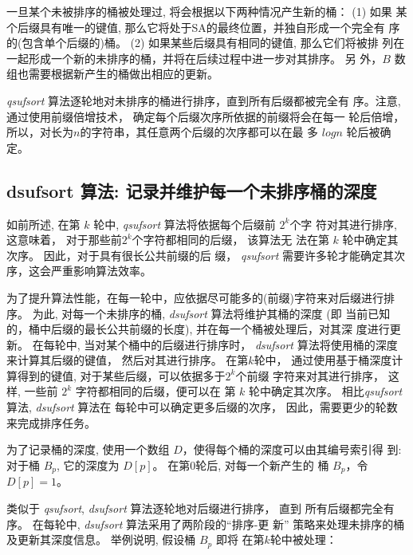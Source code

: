 一旦某个未被排序的桶被处理过, 将会根据以下两种情况产生新的桶： (1) 如果
某个后缀具有唯一的键值, 那么它将处于SA的最终位置，并独自形成一个完全有
序的(包含单个后缀的)桶。 (2) 如果某些后缀具有相同的键值, 那么它们将被排
列在一起形成一个新的未排序的桶，并将在后续过程中进一步对其排序。 另
外，$B$ 数组也需要根据新产生的桶做出相应的更新。

\emph{qsufsort} 算法逐轮地对未排序的桶进行排序，直到所有后缀都被完全有
序。注意, 通过使用前缀倍增技术， 确定每个后缀次序所依据的前缀将会在每一
轮后倍增，所以，对长为$n$的字符串，其任意两个后缀的次序都可以在最
多 $logn$ 轮后被确定。

\subsection{dsufsort 算法: 记录并维护每一个未排序桶的深度}
\label{sec:dsufsort}

如前所述, 在第 $k$ 轮中, \emph{qsufsort} 算法将依据每个后缀前 $2^k$个字
符对其进行排序, 这意味着， 对于那些前$2^k$个字符都相同的后缀， 该算法无
法在第 $k$ 轮中确定其次序。 因此，对于具有很长公共前缀的后
缀， \emph{qsufsort} 需要许多轮才能确定其次序，这会严重影响算法效率。

为了提升算法性能，在每一轮中，应依据尽可能多的(前缀)字符来对后缀进行排
序。 为此, 对每一个未排序的桶, \emph{dsufsort} 算法将维护其桶的深度 (即
当前已知的，桶中后缀的最长公共前缀的长度), 并在每一个桶被处理后，对其深
度进行更新。 在每轮中, 当对某个桶中的后缀进行排序时， \emph{dsufsort}
算法将使用桶的深度来计算其后缀的键值， 然后对其进行排序。 在第$k$轮中，
通过使用基于桶深度计算得到的键值, 对于某些后缀，可以依据多于$2^k$个前缀
字符来对其进行排序， 这样, 一些前 $2^k$ 字符都相同的后缀，便可以在
第 $k$ 轮中确定其次序。 相比\emph{qsufsort}算法, \emph{dsufsort} 算法在
每轮中可以确定更多后缀的次序， 因此，需要更少的轮数来完成排序任务。

为了记录桶的深度, 使用一个数组 $D$，使得每个桶的深度可以由其编号索引得
到: 对于桶 $B_p$, 它的深度为 $D[p]$。 在第0轮后, 对每一个新产生的
桶 $B_p$，令 $D[p] = 1$。

类似于 \emph{qsufsort}, \emph{dsufsort} 算法逐轮地对后缀进行排序， 直到
所有后缀都完全有序。 在每轮中, \emph{dsufsort} 算法采用了两阶段的“排序-更
新” 策略来处理未排序的桶及更新其深度信息。 举例说明, 假设桶 $B_p$ 即将
在第$k$轮中被处理：

